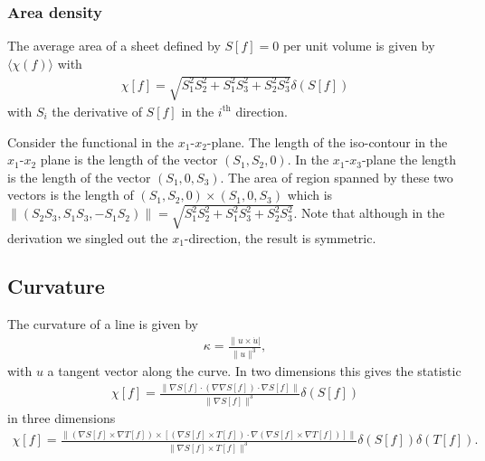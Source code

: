 \documentclass[11pt]{article}
\begin{document}
\subsubsection{Area density}
The average area of a sheet defined by $S[f]=0$ per unit volume is given by $\langle \chi(f) \rangle$ with
\begin{align}
\chi[f]= \sqrt{S_1^2 S_2^2+S_1^2S_3^2+S_2^2S_3^2} \delta(S[f])
\end{align}
with $S_i$ the derivative of $S[f]$ in the $i^\text{th}$ direction.
\begin{framed}
Consider the functional in the $x_1$-$x_2$-plane. The length of the iso-contour in the $x_1$-$x_2$ plane is the length of the vector $(S_1,S_2,0)$. In the $x_1$-$x_3$-plane the length is the length of the vector $(S_1,0,S_3)$. The area of region spanned by these two vectors is the length of $(S_1,S_2,0)\times (S_1,0,S_3)$ which is $\| (S_2 S_3, S_1 S_3, - S_1 S_2)\|=\sqrt{S_1^2S_2^2+S_1^2S_3^2 + S_2^2 S_3^2}$. Note that although in the derivation we singled out the $x_1$-direction, the result is symmetric.
\end{framed}

\subsection{Curvature}
The curvature of a line is given by
\begin{align}
\kappa = \frac{\| u \times \dot{u}|}{\| u \|^3},
\end{align}
with $u$ a tangent vector along the curve. In two dimensions this gives the statistic
\begin{align}
\chi[f]= \frac{\| \nabla S[f] \cdot (\nabla \nabla S[f]) \cdot \nabla S[f]\|}{\|\nabla S[f]\|^3}\delta(S[f])
\end{align}
in three dimensions
\begin{align}
\chi[f]=\frac{\|(\nabla S[f] \times \nabla T[f])\times \left[(\nabla S[f] \times T[f])\cdot \nabla ( \nabla S[f] \times \nabla T[f])\right]\|}{\| \nabla S[f] \times T[f] \|^3}\delta(S[f])\delta(T[f]).
\end{align}
\end{document}
